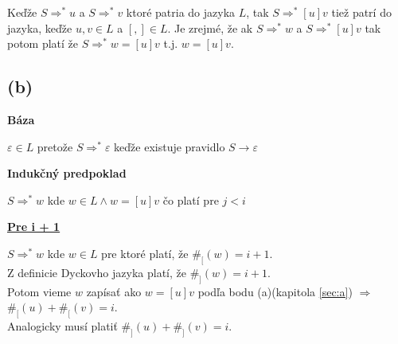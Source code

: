 \documentclass[11pt,a4paper]{article}
\begin{document}
Keďže $S \Rightarrow^* u$ a $S \Rightarrow^* v$ ktoré patria do jazyka $L$, tak $S \Rightarrow^* [u]v$ tiež patrí do jazyka, keďže $u, v \in L$ a $[,] \in L$. Je zrejmé, že ak $S \Rightarrow^* w$ a $S \Rightarrow^* [u]v$ tak potom platí že $S \Rightarrow^* w = [u]v$ t.j. $w = [u]v$.\\

\subsection{(b)}

\textbf{Báza}
\begin{flushright}
\begin{minipage}{0.95\textwidth}
    $\varepsilon \in L$ pretože $S \Rightarrow^{*} \varepsilon$ keďže existuje pravidlo $S \rightarrow \varepsilon$\\
\end{minipage}
\end{flushright}

\textbf{Indukčný predpoklad}
\begin{flushright}
\begin{minipage}{0.95\textwidth}
    $S \Rightarrow^{*} w$ kde $w \in L \wedge w = [u]v$ čo platí pre $j < i$\\
\end{minipage}
\end{flushright}


\underline{\textbf{Pre i + 1}}
\begin{flushright}
\begin{minipage}{0.95\textwidth}
    $S \Rightarrow^{*} w$ kde $w \in L$ pre ktoré platí, že $\#_{[}(w)=i+1$.\\
    Z definicie Dyckovho jazyka platí, že $\#_{]}(w)=i+1$.\\
    Potom vieme $w$ zapísať ako $w=[u]v$ podľa bodu (a)(kapitola \ref{sec:a}) $\Longrightarrow$ $\#_{[}(u) + \#_{[}(v) = i$.\\
    Analogicky musí platiť $\#_{]}(u) + \#_{]}(v) = i$.
\end{minipage}
\end{flushright}
\end{document}
